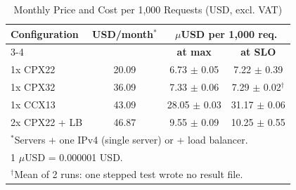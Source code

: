 \begin{table}[htbp]
\caption{Monthly Price and Cost per 1,000 Requests (USD, excl. VAT)}
\label{tab:cost}
\centering
\footnotesize
\setlength{\tabcolsep}{3pt}
\begin{tabular}{|l|c|c|c|}
\hline
\textbf{Configuration} & \textbf{USD/month}$^*$ & \multicolumn{2}{c|}{\textbf{$\mu$USD per 1,000 req.}} \\
\cline{3-4}
 & & \textbf{at max} & \textbf{at SLO} \\
\hline
1x CPX22 & 20.09 & 6.73 $\pm$ 0.05 & 7.22 $\pm$ 0.39 \\
\hline
1x CPX32 & 36.09 & 7.33 $\pm$ 0.06 & 7.29 $\pm$ 0.02$^\dagger$ \\
\hline
1x CCX13 & 43.09 & 28.05 $\pm$ 0.03 & 31.17 $\pm$ 0.06 \\
\hline
2x CPX22 + LB & 46.87 & 9.55 $\pm$ 0.09 & 10.25 $\pm$ 0.55 \\
\hline
\multicolumn{4}{l}{$^*$Servers + one IPv4 (single server) or + load balancer.} \\
\multicolumn{4}{l}{1 $\mu$USD = 0.000001 USD.} \\
\multicolumn{4}{l}{$^\dagger$Mean of 2 runs: one stepped test wrote no result file.} \\
\end{tabular}
\end{table}
